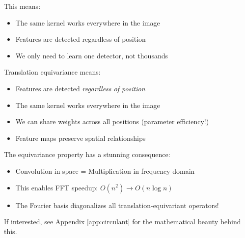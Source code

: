 \documentclass{article}
\begin{document}
This means:
\begin{itemize}
    \item The same kernel works everywhere in the image
    \item Features are detected regardless of position
    \item We only need to learn one detector, not thousands
\end{itemize}






\begin{tcolorbox}[colback=green!5!white, colframe=green!50!black, title=The Power of Equivariance]
Translation equivariance means:
\begin{itemize}
    \item Features are detected \emph{regardless of position}
    \item The same kernel works everywhere in the image
    \item We can share weights across all positions (parameter efficiency!)
    \item Feature maps preserve spatial relationships
\end{itemize}
\end{tcolorbox}

\begin{tcolorbox}[colback=purple!5!white, colframe=purple!50!black, title=Computational Magic (Preview)]
The equivariance property has a stunning consequence:
\begin{itemize}
    \item Convolution in space = Multiplication in frequency domain
    \item This enables FFT speedup: $O(n^2) \rightarrow O(n \log n)$
    \item The Fourier basis diagonalizes all translation-equivariant operators!
\end{itemize}
If interested, see Appendix \ref{app:circulant} for the mathematical beauty behind this.
\end{tcolorbox}



\end{document}
